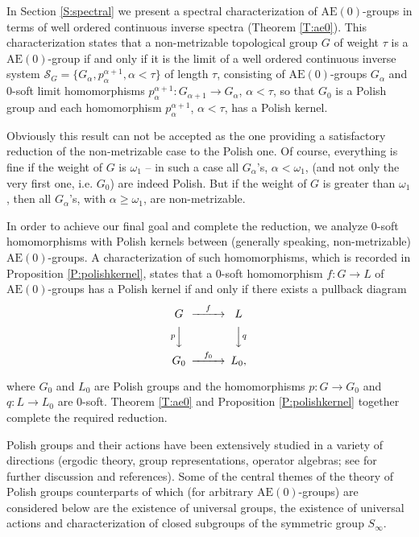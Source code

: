 \documentclass[12pt,draft]{amsart}
\theoremstyle{plain}
\theoremstyle{definition}
\numberwithin{equation}{section}
\begin{document}
In Section \ref{S:spectral} we present a spectral characterization of
$\text{AE}(0)$-groups in terms of well ordered continuous
inverse spectra (Theorem \ref{T:ae0}). This characterization
states that a non-metrizable topological group $G$ of weight $\tau$
is a $\text{AE}(0)$-group if and
only if it is the limit of a well ordered continuous inverse system
${\mathcal S}_{G} = \{ G_{\alpha}, p_{\alpha}^{\alpha +1},
\alpha < \tau \}$ of length $\tau$, consisting of
$\text{AE}(0)$-groups $G_{\alpha}$ and $0$-soft
limit homomorphisms 
$p_{\alpha}^{\alpha +1} \colon G_{\alpha +1} \to G_{\alpha}$,
$\alpha < \tau$, so that $G_{0}$ is a Polish group and each homomorphism
$p_{\alpha}^{\alpha +1}$, $\alpha < \tau$, has a Polish kernel.

Obviously this result can not be accepted as the one providing a
satisfactory reduction of the non-metrizable case to the Polish
one. Of course, everything is fine if the weight of $G$ is
$\omega_{1}$ -- in such a case all $G_{\alpha}$'s,
$\alpha < \omega_{1}$, (and not only the very first one,
i.e. $G_{0}$) are indeed Polish. But if the weight of $G$
is greater than $\omega_{1}$, then all $G_{\alpha}$'s, with
$\alpha \geq \omega_{1}$, are non-metrizable. 

In order to achieve our final goal and complete the reduction, we
analyze $0$-soft homomorphisms with Polish kernels between
(generally speaking, non-metrizable)
$\text{AE}(0)$-groups. A characterization of such
homomorphisms, which is recorded in Proposition \ref{P:polishkernel},
states that a $0$-soft homomorphism
$f \colon G \to L$ of $\text{AE}(0)$-groups has a Polish kernel
if and only if there exists a pullback diagram
\[
\begin{CD}
G @>f>> L\\
@V{p}VV @VV{q}V\\
G_{0} @>f_{0}>> L_{0},
\end{CD}
\]

\noindent where $G_{0}$ and $L_{0}$ are Polish groups
and the homomorphisms $p \colon G \to G_{0}$ and
$q \colon L \to L_{0}$ are $0$-soft. Theorem
\ref{T:ae0} and Proposition \ref{P:polishkernel}
together complete the required reduction. 

Polish groups and their actions have been
extensively studied in a variety of directions (ergodic theory,
group representations,
operator algebras; see \cite{bekech96} for further
discussion and references). Some of the central themes of
the theory of Polish groups counterparts of which (for
arbitrary $\text{AE}(0)$-groups) are considered below  are the
existence of universal groups, the existence of universal actions and
characterization of closed subgroups of the symmetric group $S_{\infty}$.
\end{document}
